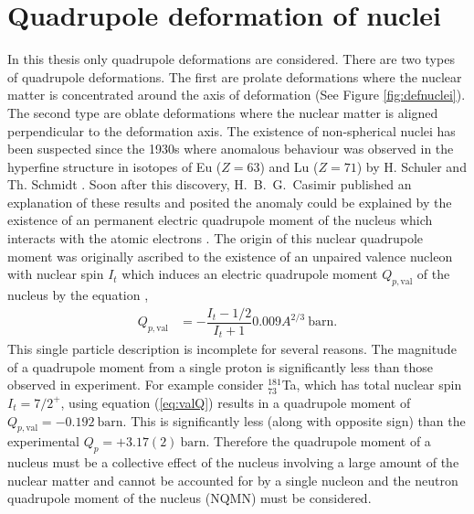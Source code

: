 \documentclass[10pt,a4paper, twoside, openright]{report}
\begin{document}
\section{Quadrupole deformation of nuclei} 
In this thesis only quadrupole deformations are considered. There are two types of quadrupole deformations. The first are prolate deformations where the nuclear matter is concentrated around the axis of deformation (See Figure \ref{fig:defnuclei}). The second type are oblate deformations where the nuclear matter is aligned perpendicular to the deformation axis. The existence of non-spherical nuclei has been suspected since the 1930s where anomalous behaviour was observed in the hyperfine structure in isotopes of Eu ($Z=63$) and Lu ($Z=71$) by H. Schuler and Th. Schmidt \cite{Schuler1935(1), Schuler1935(2)}. Soon after this discovery, H.~B.~G.~Casimir published an explanation of these results and posited the anomaly could be explained by the existence of an permanent electric quadrupole moment of the nucleus which interacts with the atomic electrons \cite{Casimir1935, Casimir1936}. The origin of this nuclear quadrupole moment was originally ascribed to the existence of an unpaired valence nucleon with nuclear spin $I_t$ which induces an electric quadrupole moment  $Q_{p,\text{val}}$ of the nucleus by the equation \cite{BohrMottVol1},
\begin{align}\label{eq:valQ}
Q_{p,\text{val}} &=  - \dfrac{I_t-1/2}{I_t + 1}0.009A^{2/3} \ \text{barn}.
\end{align}  
This single particle description is incomplete for several reasons. The magnitude of a quadrupole moment from a single proton is significantly less than those observed in experiment. For example consider $^{181}_{73}$Ta, which has total nuclear spin $I_t=7/2^{+}$, using equation (\ref{eq:valQ}) results in a quadrupole moment of $Q_{p,\text{val}} = -0.192 \ \text{barn}$. This is significantly less (along with opposite sign) than the experimental $Q_p = +3.17(2) \ \text{barn}$. Therefore the quadrupole moment of a nucleus must be a collective effect of the nucleus involving a large amount of the nuclear matter and cannot be accounted for by a single nucleon and the neutron quadrupole moment of the nucleus (NQMN) must be considered. \\
\linebreak
\end{document}
